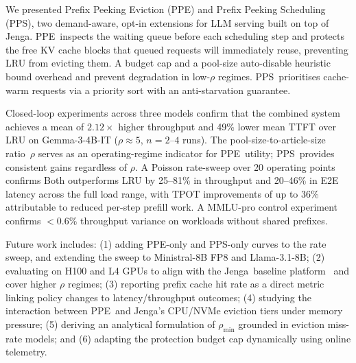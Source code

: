 \documentclass[journal]{IEEEtran}
\newcommand{\ppe}{\textsc{PPE}}
\newcommand{\pps}{\textsc{PPS}}
\newcommand{\rhomin}{\rho_{\min}}
\newcommand{\jenga}{Jenga}
\begin{document}
We presented Prefix Peeking Eviction (\ppe) and Prefix Peeking Scheduling
(\pps), two demand-aware, opt-in extensions for LLM serving built on top of
\jenga.  \ppe\ inspects the waiting queue before each scheduling step and
protects the free KV cache blocks that queued requests will immediately reuse,
preventing LRU from evicting them.  A budget cap and a pool-size auto-disable
heuristic bound overhead and prevent degradation in low-$\rho$ regimes.
\pps\ prioritises cache-warm requests via a priority sort with an
anti-starvation guarantee.

Closed-loop experiments across three models confirm that the combined system
achieves a mean of $2.12\times$ higher throughput and 49\% lower mean TTFT over
LRU on Gemma-3-4B-IT ($\rho\approx5$, $n=2$--$4$ runs).  The
pool-size-to-article-size ratio~$\rho$ serves as an operating-regime indicator
for \ppe\ utility; \pps\ provides consistent gains regardless of $\rho$.  A
Poisson rate-sweep over 20 operating points confirms Both outperforms LRU by
25--81\% in throughput and 20--46\% in E2E latency across the full load range,
with TPOT improvements of up to 36\% attributable to reduced per-step prefill
work.  A MMLU-pro control experiment confirms $<0.6\%$ throughput variance on
workloads without shared prefixes.

Future work includes: (1) adding PPE-only and PPS-only curves to the rate
sweep, and extending the sweep to Ministral-8B FP8 and Llama-3.1-8B; (2)
evaluating on H100 and L4 GPUs to align with the \jenga\ baseline
platform~\cite{jenga2025} and cover higher $\rho$ regimes; (3) reporting
prefix cache hit rate as a direct metric linking policy changes to
latency/throughput outcomes; (4) studying the interaction between \ppe\ and
\jenga's CPU/NVMe eviction tiers under memory pressure; (5) deriving an
analytical formulation of $\rhomin$ grounded in eviction miss-rate models; and
(6) adapting the protection budget cap dynamically using online telemetry.


\end{document}

